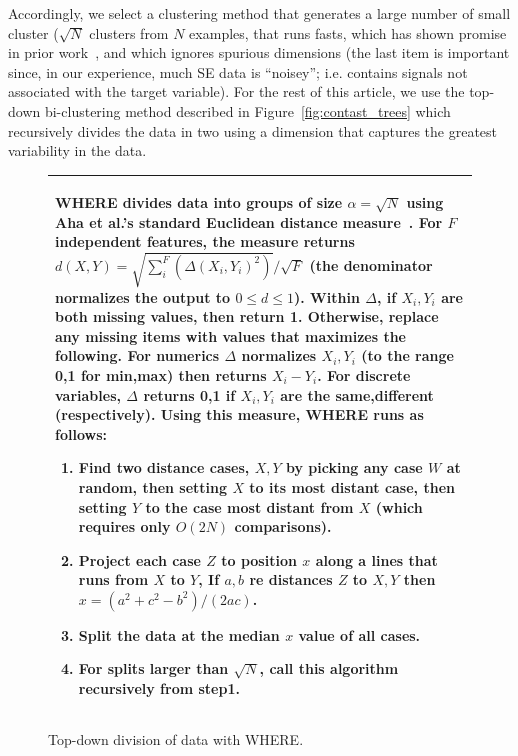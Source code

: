 \documentclass{sig-alternate}
\newcommand{\fig}[1]{Figure~\ref{fig:#1}}
\begin{document}
	Accordingly, we select a clustering method that generates a large
	number of small cluster
	($\sqrt{N}$ clusters
	from $N$ examples, that runs fasts, which has shown promise in prior work~\cite{Menzies2013}, and which ignores spurious dimensions (the last item is important since, in our experience, much SE data is ``noisey''; i.e. contains signals not associated with the target variable). For the rest of this article,
	we use  the top-down
	bi-clustering method described in \fig{contast_trees} which recursively divides the
	data in two  using a dimension that captures the greatest variability in the data. 
	\begin{figure}[t]\small
	\begin{tabular}{|p{.95\linewidth}|}\hline 
		WHERE  divides data into  groups of size $\alpha=\sqrt{N}$ using 
		 Aha et al.'s standard Euclidean distance measure~\cite{aha91}.  For $F$ independent features, the measure returns   $d(X,Y)=\sqrt{\sum_i^F \left(\Delta(X_i,Y_i)^2\right)}/\sqrt{F}$
			(the denominator normalizes the output to $0 \le d \le 1$).
			Within $\Delta$, if   $X_i,Y_i$ are both missing  values, then  return 1.
			Otherwise, replace any  missing items with values that maximizes the following.
			For numerics $\Delta$ normalizes $X_i,Y_i$ (to the range 0,1 for min,max) then
			returns 
			$X_i - Y_i$. For discrete variables, $\Delta$ returns 0,1 if $X_i,Y_i$ are the
			same,different (respectively).  
		Using this measure, WHERE runs as follows:
		\begin{enumerate}[leftmargin=3mm]
			\item Find   two   distance cases,  $X,Y$
			by picking any case $W$ at random, then setting $X$ to its most
			distant case, then setting $Y$ to the case most distant from
			$X$
			(which requires only $O(2N)$ comparisons).
			\item Project each case $Z$
			to position $x$ along a    lines that  runs from $X$ to $Y$, If $a,b$ re distances  $Z$ to $X,Y$  then  $x = (a^2+c^2 - b^2)/(2ac)$.
			\item Split the data at the median $x$ value of all cases.
			\item For   splits larger than  $\sqrt{N}$, call this algorithm recursively  from step1.
		\end{enumerate}\\\hline
		\end{tabular}
		\caption{Top-down division of data with WHERE.}\label{fig:where}
		\end{figure}
		
\end{document}
